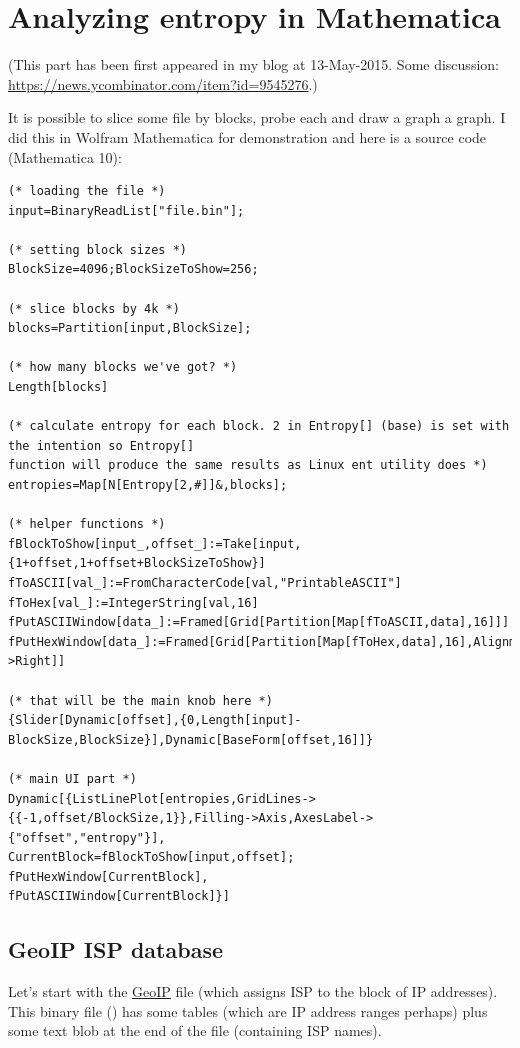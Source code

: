 \section{Analyzing entropy in Mathematica}

(This part has been first appeared in my blog at 13-May-2015.
Some discussion: \url{https://news.ycombinator.com/item?id=9545276}.)

It is possible to slice some file by blocks, probe each and draw a graph a graph.
I did this in Wolfram Mathematica for demonstration and here is a source code (Mathematica 10):

\begin{lstlisting}
(* loading the file *)
input=BinaryReadList["file.bin"];

(* setting block sizes *)
BlockSize=4096;BlockSizeToShow=256;

(* slice blocks by 4k *)
blocks=Partition[input,BlockSize];

(* how many blocks we've got? *)
Length[blocks]

(* calculate entropy for each block. 2 in Entropy[] (base) is set with the intention so Entropy[] 
function will produce the same results as Linux ent utility does *)
entropies=Map[N[Entropy[2,#]]&,blocks];

(* helper functions *)
fBlockToShow[input_,offset_]:=Take[input,{1+offset,1+offset+BlockSizeToShow}]
fToASCII[val_]:=FromCharacterCode[val,"PrintableASCII"]
fToHex[val_]:=IntegerString[val,16]
fPutASCIIWindow[data_]:=Framed[Grid[Partition[Map[fToASCII,data],16]]]
fPutHexWindow[data_]:=Framed[Grid[Partition[Map[fToHex,data],16],Alignment->Right]]

(* that will be the main knob here *)
{Slider[Dynamic[offset],{0,Length[input]-BlockSize,BlockSize}],Dynamic[BaseForm[offset,16]]}

(* main UI part *)
Dynamic[{ListLinePlot[entropies,GridLines->{{-1,offset/BlockSize,1}},Filling->Axis,AxesLabel->{"offset","entropy"}],
CurrentBlock=fBlockToShow[input,offset];
fPutHexWindow[CurrentBlock],
fPutASCIIWindow[CurrentBlock]}]
\end{lstlisting}

\subsection{GeoIP ISP database}

Let's start with the \href{https://www.maxmind.com/en/geoip-demo}{GeoIP} file (which assigns ISP to the block of IP addresses).
This binary file () has some tables (which are IP address ranges perhaps) plus some text blob at the end of the file
(containing ISP names).

